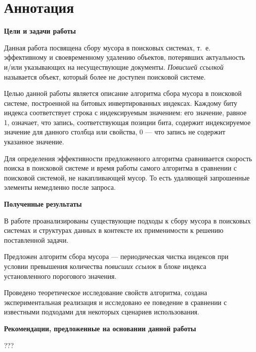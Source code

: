 \newpage
\section*{Аннотация}

\textbf{Цели и задачи работы}

Данная работа посвящена сбору мусора в поисковых системах, т.~е. эффективному и
своевременному удалению объектов, потерявших актуальность и/или указывающих на
несуществующие документы. \textit{Повисшей ссылкой} называется объект, который
более не доступен поисковой системе.

Целью данной работы является описание алгоритма сбора мусора в поисковой системе,
построенной на битовых инвертированных индексах. Каждому биту индекса
соответствует строка с индексируемым значением: его значение, равное 1, означает,
что запись, соответствующая позиции бита, содержит индексируемое значение для
данного столбца или свойства, 0 — что запись не содержит указанное значение.

Для определения эффективности предложенного алгоритма сравнивается скорость
поиска в поисковой системе и время работы самого алгоритма в сравнении с
поисковой системой, не накапливающей мусор. То есть удаляющей запрошенные
элементы немедленно после запроса.

\textbf{Полученные результаты}

В работе проанализированы существующие подходы к сбору мусора в поисковых
системах и структурах данных в контексте их применимости к решению поставленной
задачи.

Предложен алгоритм сбора мусора --- периодическая чистка индексов при условии
превышения количества \textit{повисших ссылок} в блоке индекса установленного
порогового значения.

Проведено теоретическое исследование свойств алгоритма, создана экспериментальная
реализация и исследовано ее поведение в сравнении с известными подходами для
некоторых сценариев использования.

\textbf{Рекомендации, предложенные на основании данной работы}

???
